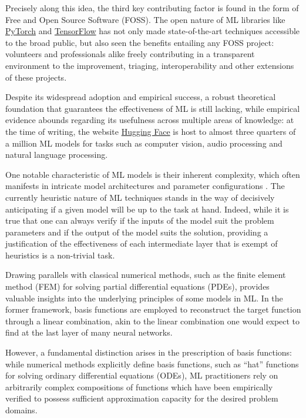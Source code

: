 \documentclass[12pt]{report} %
\begin{document}
Precisely along this idea, the third key contributing factor is found in the form
of Free and Open Source Software (FOSS). The open nature of ML libraries like
\href{https://pytorch.org/}{PyTorch} and \href{https://www.tensorflow.org/}{TensorFlow}
has not only made state-of-the-art
techniques accessible to the broad public, but also seen the benefits entailing any FOSS
project: volunteers and professionals alike freely
contributing in a transparent environment
to the improvement, triaging, interoperability and other extensions of these projects.

Despite its widespread adoption and empirical success, a robust theoretical foundation that guarantees the effectiveness of ML is still lacking, while empirical evidence abounds regarding its usefulness across multiple areas of knowledge: at the time of writing, the website \href{https://huggingface.co/}{Hugging Face} is host to almost three quarters of a million ML models for tasks such as computer vision, audio processing and natural language processing.

One notable characteristic of ML models is their inherent complexity, which often manifests
in intricate model architectures and parameter configurations \cite{cuomo2022scientific}.
The currently heuristic nature of ML techniques stands in the way of decisively
anticipating if a given model will be up to the task at hand.
Indeed, while it is true that one can always verify if the inputs of
the model suit the problem parameters and if the output of the model suits the solution,
providing a justification of the effectiveness of each intermediate layer that is
exempt of heuristics is a non-trivial task.

Drawing parallels with classical numerical methods, such as the finite element method (FEM) for
solving partial differential equations (PDEs), provides valuable insights into the underlying
principles of some models in ML. In the former framework,
basis functions are employed to
reconstruct the target function through a linear combination, akin to the linear combination
one would expect to find at the last layer of many neural networks.

However, a fundamental distinction arises in the prescription of basis functions: while numerical methods explicitly define basis functions, such as ``hat'' functions for solving ordinary differential equations (ODEs), ML practitioners rely on arbitrarily complex compositions of functions which have been empirically verified to possess sufficient approximation capacity for the desired problem domains.
\end{document}
